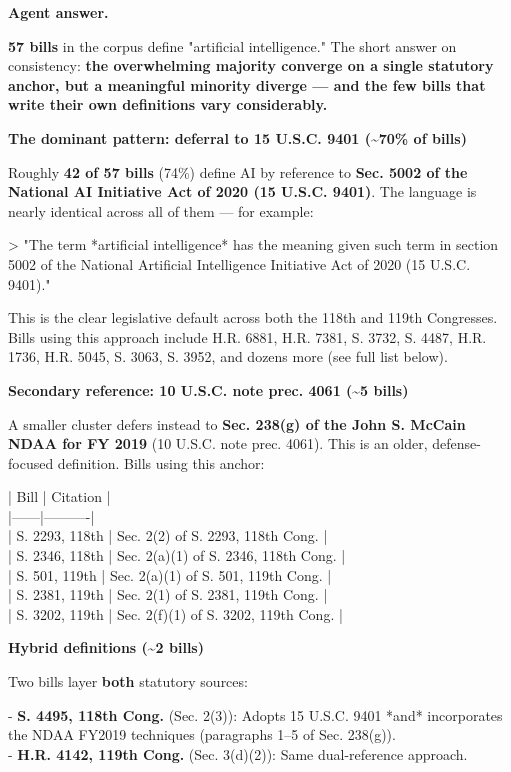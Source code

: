\documentclass[11pt]{article}
\newcommand{\fieldlabel}[1]{\textbf{\color{navy}#1}\quad}
\begin{document}
\fieldlabel{Agent answer.}\par
\textbf{57 bills} in the corpus define "artificial intelligence." The short answer on consistency: \textbf{the overwhelming majority converge on a single statutory anchor, but a meaningful minority diverge --- and the few bills that write their own definitions vary considerably.}

\textbf{The dominant pattern: deferral to 15 U.S.C. 9401 (\textasciitilde{}70\% of bills)}

Roughly \textbf{42 of 57 bills} (74\%) define AI by reference to \textbf{Sec. 5002 of the National AI Initiative Act of 2020 (15 U.S.C. 9401)}. The language is nearly identical across all of them --- for example:

\textgreater{} "The term *artificial intelligence* has the meaning given such term in section 5002 of the National Artificial Intelligence Initiative Act of 2020 (15 U.S.C. 9401)."

This is the clear legislative default across both the 118th and 119th Congresses. Bills using this approach include H.R. 6881, H.R. 7381, S. 3732, S. 4487, H.R. 1736, H.R. 5045, S. 3063, S. 3952, and dozens more (see full list below).

\textbf{Secondary reference: 10 U.S.C. note prec. 4061 (\textasciitilde{}5 bills)}

A smaller cluster defers instead to \textbf{Sec. 238(g) of the John S. McCain NDAA for FY 2019} (10 U.S.C. note prec. 4061). This is an older, defense-focused definition. Bills using this anchor:

| Bill | Citation | \\
|------|----------| \\
| S. 2293, 118th | Sec. 2(2) of S. 2293, 118th Cong. | \\
| S. 2346, 118th | Sec. 2(a)(1) of S. 2346, 118th Cong. | \\
| S. 501, 119th | Sec. 2(a)(1) of S. 501, 119th Cong. | \\
| S. 2381, 119th | Sec. 2(1) of S. 2381, 119th Cong. | \\
| S. 3202, 119th | Sec. 2(f)(1) of S. 3202, 119th Cong. |

\textbf{Hybrid definitions (\textasciitilde{}2 bills)}

Two bills layer \textbf{both} statutory sources:

- \textbf{S. 4495, 118th Cong.} (Sec. 2(3)): Adopts 15 U.S.C. 9401 *and* incorporates the NDAA FY2019 techniques (paragraphs 1--5 of Sec. 238(g)). \\
- \textbf{H.R. 4142, 119th Cong.} (Sec. 3(d)(2)): Same dual-reference approach.
\end{document}
